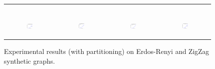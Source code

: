 \begin{figure}[ht]
\begin{tabular}{cccc}
\begin{subfigure}[b]{0.22\textwidth}
			\caption{}
			\label{appfig:partition:diffFA_CF2G_zigzag_setcover}
	  \end{subfigure} \\
	  \begin{subfigure}[b]{0.22\textwidth}
	  	\includegraphics[width=110pt]{images_partition/validated_CC2G_erdosrenyi_maxgraphcut.pdf}
			\caption{}
			\label{appfig:partition:validated_CC2G_erdosrenyi_maxgraphcut}
	  \end{subfigure} &
	  \begin{subfigure}[b]{0.22\textwidth}
	  	\includegraphics[width=110pt]{images_partition/validated_CC2G_erdosrenyi_setcover.pdf}
			\caption{}
			\label{appfig:partition:validated_CC2G_erdosrenyi_setcover}
	  \end{subfigure} &
	  \begin{subfigure}[b]{0.22\textwidth}
	  	\includegraphics[width=110pt]{images_partition/validated_CC2G_zigzag_maxgraphcut.pdf}
			\caption{}
			\label{appfig:partition:validated_CC2G_zigzag_maxgraphcut}
	  \end{subfigure} &
	  \begin{subfigure}[b]{0.22\textwidth}
	  	\includegraphics[width=110pt]{images_partition/validated_CC2G_zigzag_setcover.pdf}
			\caption{}
			\label{appfig:partition:validated_CC2G_zigzag_setcover}
	  \end{subfigure} \\
  \end{tabular}
  \caption{Experimental results (with partitioning) on Erdos-Renyi and ZigZag synthetic graphs.}
\end{figure}


